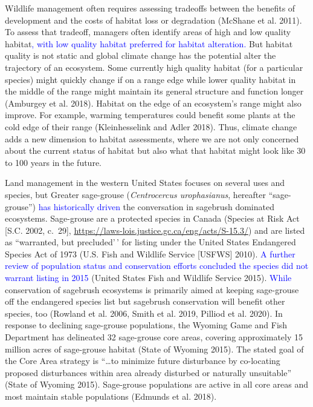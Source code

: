 \documentclass[
  12pt,
]{article}
\begin{document}
Wildlife management often requires assessing tradeoffs between the benefits of development and the costs of habitat loss or degradation (McShane et al. 2011).
To assess that tradeoff, managers often identify areas of high and low quality habitat\textcolor{blue}{, with low quality habitat preferred for habitat alteration.}
But habitat quality is not static and global climate change has the potential alter the trajectory of an ecosystem.
Some currently high quality habitat (for a particular species) might quickly change if on a range edge while lower quality habitat in the middle of the range might maintain its general structure and function longer (Amburgey et al. 2018).
Habitat on the edge of an ecosystem's range might also improve.
For example, warming temperatures could benefit some plants at the cold edge of their range (Kleinhesselink and Adler 2018).
Thus, climate change adds a new dimension to habitat assessments, where we are not only concerned about the current status of habitat but also what that habitat might look like 30 to 100 years in the future.

Land management in the western United States focuses on several uses and species, but Greater sage-grouse (\emph{Centrocercus urophasianus}, hereafter ``sage-grouse'') \textcolor{blue}{has historically driven} the conversation in sagebrush dominated ecosystems.
Sage-grouse are a protected species in Canada (Species at Risk Act {[}S.C. 2002, c.~29{]}, \url{https://laws-lois.justice.gc.ca/eng/acts/S-15.3/}) and are listed as ``warranted, but precluded'\,' for listing under the United States Endangered Species Act of 1973 (U.S. Fish and Wildlife Service
{[}USFWS{]} 2010).
\textcolor{blue}{A further review of population status and conservation efforts concluded the species did not warrant listing in 2015} (United States Fish and Wildlife Service 2015).
\textcolor{blue}{While} conservation of sagebrush ecosystems is primarily aimed at keeping sage-grouse off the endangered species list but sagebrush conservation will benefit other species, too (Rowland et al. 2006, Smith et al. 2019, Pilliod et al. 2020).
In response to declining sage-grouse populations, the Wyoming Game and Fish Department has delineated 32 sage-grouse core areas, covering approximately 15 million acres of sage-grouse habitat (State of Wyoming 2015).
The stated goal of the Core Area strategy is ``\ldots to minimize future disturbance by co-locating proposed disturbances within area already disturbed or naturally unsuitable'' (State of Wyoming 2015).
Sage-grouse populations are active in all core areas and most maintain stable populations (Edmunds et al. 2018).
\end{document}
